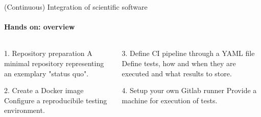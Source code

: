\begin{frame}{(Continuous) Integration of scientific software}
    \framesubtitle{Hands on: overview}
    \begin{columns}
    \begin{column}{0.48\textwidth}
        \begin{block}{1. Repository preparation}
            A minimal repository representing an exemplary
            "status quo".
        \end{block}
        \begin{block}{2. Create a Docker image}
            Configure a reproducibile testing environment.
        \end{block}
    \end{column}

    \begin{column}{0.48\textwidth}
        \begin{block}{3. Define CI pipeline through a YAML file}
            Define tests, how and when they are executed and what
            results to store.
        \end{block}
        \begin{exampleblock}{4. Setup your own Gitlab runner}
            Provide a machine for execution of tests.
        \end{exampleblock}
    \end{column}
    \end{columns}
\end{frame}


